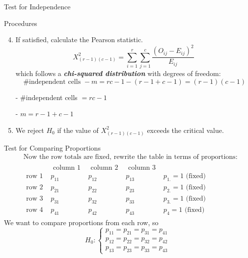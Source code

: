 \documentclass{beamer}
\newcommand{\bb}[1]{\textcolor{antiquefuchsia}{\textbf{\textit{#1}}}}
\begin{document}
\begin{frame}{Test for Independence}
\begin{block}{Procedures}
\begin{enumerate}
\setcounter{enumi}{3}
\item If satisfied, calculate the Pearson statistic.
$$
X_{(r-1)(c-1)}^{2}=\sum_{i=1}^{r} \sum_{j=1}^{c} \frac{\left(O_{i j}-E_{i j}\right)^{2}}{E_{i j}}
$$
which follows a \bb{chi-squared distribution} with degrees of freedom:
$$
\text { \#independent cells }-m=r c-1-(r-1+c-1)=(r-1)(c-1)
$$
\begin{center}
- \#independent cells $=r c-1$

- $m=r-1+c-1$ 
\end{center}
\item We reject $H_{0}$ if the value of $X_{(r-1)(c-1)}^{2}$ exceeds the critical value.
\end{enumerate}
\end{block}
\end{frame}

\begin{frame}{Test for Comparing Proportions}
$$
\begin{aligned}
&\text { Now the row totals are fixed, rewrite the table in terms of proportions: }\\
&\begin{array}{l|ccc|l} 
& \text { column 1 } & \text { column 2 } & \text { column 3 } & \\
\hline \text { row 1 } & p_{11} & p_{12} & p_{13} & p_{1 .}=1 \text { (fixed) } \\
\text { row 2 } & p_{21} & p_{22} & p_{23} & p_{2 .}=1 \text { (fixed) } \\
\text { row 3 } & p_{31} & p_{32} & p_{33} & p_{3 .}=1 \text { (fixed) } \\
\text { row 4 } & p_{41} & p_{42} & p_{43} & p_{4}=1 \text { (fixed) }
\end{array}
\end{aligned}
$$
We want to compare proportions from each row, so
$$
H_{0}:\left\{\begin{array}{l}
p_{11}=p_{21}=p_{31}=p_{41} \\
p_{12}=p_{22}=p_{32}=p_{42} \\
p_{13}=p_{23}=p_{33}=p_{43}
\end{array}\right.
$$
\end{frame}
\end{document}
